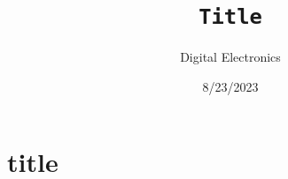 \documentclass[a4paper,12pt]{article}
\title{\texttt{Title}\\\hrulefill}
\author{Digital Electronics}
\date{8/23/2023}
\begin{document}
    \maketitle

    \section*{title}
\end{document}
